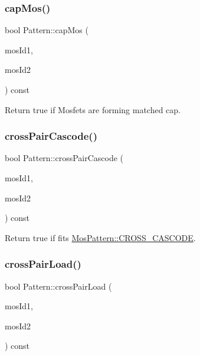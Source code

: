 \subsubsection{\texorpdfstring{cap\+Mos()}{capMos()}}
{\footnotesize\ttfamily bool Pattern\+::cap\+Mos (\begin{DoxyParamCaption}\item[{\hyperlink{type_8h_a581e8093e28e7362f2b6937296190676}{Index\+Type}}]{mos\+Id1,  }\item[{\hyperlink{type_8h_a581e8093e28e7362f2b6937296190676}{Index\+Type}}]{mos\+Id2 }\end{DoxyParamCaption}) const\hspace{0.3cm}{\ttfamily [private]}}



Return true if Mosfets are forming matched cap. 

\mbox{\label{classPattern_a371cef1fc7d0c4d5b291d80dc5c4b777}} 
\subsubsection{\texorpdfstring{cross\+Pair\+Cascode()}{crossPairCascode()}}
{\footnotesize\ttfamily bool Pattern\+::cross\+Pair\+Cascode (\begin{DoxyParamCaption}\item[{\hyperlink{type_8h_a581e8093e28e7362f2b6937296190676}{Index\+Type}}]{mos\+Id1,  }\item[{\hyperlink{type_8h_a581e8093e28e7362f2b6937296190676}{Index\+Type}}]{mos\+Id2 }\end{DoxyParamCaption}) const\hspace{0.3cm}{\ttfamily [private]}}



Return true if fits \hyperlink{type_8h_af19eddb079bfea723256710b029c38e8adb952aa3809767bf108688a754ebbf2c}{Mos\+Pattern\+::\+C\+R\+O\+S\+S\+\_\+\+C\+A\+S\+C\+O\+DE}. 

\mbox{\label{classPattern_afe6e5456a639417112340f5f9d164b32}} 
\subsubsection{\texorpdfstring{cross\+Pair\+Load()}{crossPairLoad()}}
{\footnotesize\ttfamily bool Pattern\+::cross\+Pair\+Load (\begin{DoxyParamCaption}\item[{\hyperlink{type_8h_a581e8093e28e7362f2b6937296190676}{Index\+Type}}]{mos\+Id1,  }\item[{\hyperlink{type_8h_a581e8093e28e7362f2b6937296190676}{Index\+Type}}]{mos\+Id2 }\end{DoxyParamCaption}) const\hspace{0.3cm}{\ttfamily [private]}}




